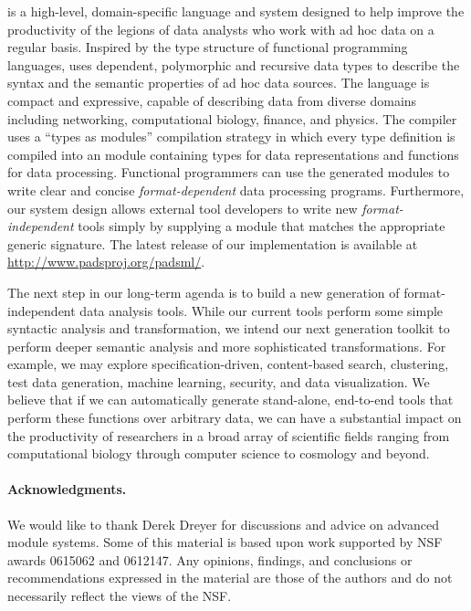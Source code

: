 \documentclass{sigplanconf}
\begin{document}
\padsml{} is a high-level, domain-specific language and system
designed to help improve the productivity of the legions of data analysts
who work with ad hoc data on a regular basis.  
Inspired by the type structure of functional
programming languages, \padsml{} uses dependent,
polymorphic and recursive data types to describe the syntax and 
the semantic properties of ad hoc data sources.  The language 
is compact and expressive, capable of describing data from diverse 
domains including networking, computational biology, finance, and physics. 
The \padsml{} compiler uses a ``types as modules'' compilation strategy
in which every \padsml{} type definition is compiled into
an \ocaml{} module containing types for data representations
and functions for data processing.  Functional programmers
can use the generated modules to write clear and concise {\em format-dependent}
data processing programs.  Furthermore, our system design
allows external tool developers to write new {\em format-independent} tools
simply by supplying a module that matches the appropriate generic
signature.  The latest release of our implementation is available
at \url{http://www.padsproj.org/padsml/}.

The next step in our long-term agenda is to build a new generation of
format-independent data analysis tools.  While our current tools
perform some simple syntactic analysis and transformation, we intend
our next generation toolkit to perform deeper semantic analysis and
more sophisticated transformations.  For example, we may explore
specification-driven, content-based search, clustering, test data
generation, machine learning, security, and data visualization.  We
believe that if we can automatically generate stand-alone, end-to-end
tools that perform these functions over arbitrary data, we can have a
substantial impact on the productivity of researchers in a broad array
of scientific fields ranging from computational biology through
computer science to cosmology and beyond.


\paragraph*{Acknowledgments.}
We would like to thank Derek Dreyer for discussions and advice on
advanced module systems.  Some of this material is based upon work 
supported by NSF awards 0615062 and 0612147.  
Any opinions, findings, and conclusions 
or recommendations expressed in the material are those of the authors 
and do not necessarily reflect the views of the NSF.
\end{document}
